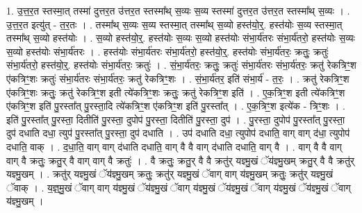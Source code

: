 \documentclass[17pt]{extarticle}
\begin{document}
1. उ॒त्त॒र॒त स्तस्मा॒त् तस्मा॑ दुत्तर॒त उ॑त्तर॒त स्तस्मा᳚थ् स॒व्यः स॒व्य स्तस्मा॑ दुत्तर॒त उ॑त्तर॒त स्तस्मा᳚थ् स॒व्यः । . उ॒त्त॒र॒त इत्यु॑त् - त॒र॒तः । . तस्मा᳚थ् स॒व्यः स॒व्य स्तस्मा॒त् तस्मा᳚थ् स॒व्यो हस्त॑यो॒र्॒. हस्त॑योः स॒व्य स्तस्मा॒त् तस्मा᳚थ् स॒व्यो हस्त॑योः । . स॒व्यो हस्त॑यो॒र्॒. हस्त॑योः स॒व्यः स॒व्यो हस्त॑योः संभा॒र्य॑तरः संभा॒र्य॑तरो॒ हस्त॑योः स॒व्यः स॒व्यो हस्त॑योः संभा॒र्य॑तरः । . हस्त॑योः संभा॒र्य॑तरः संभा॒र्य॑तरो॒ हस्त॑यो॒र्॒. हस्त॑योः संभा॒र्य॑तरः॒ क्रतुः॒ क्रतुः॑ संभा॒र्य॑तरो॒ हस्त॑यो॒र्॒. हस्त॑योः संभा॒र्य॑तरः॒ क्रतुः॑ । . सं॒भा॒र्य॑तरः॒ क्रतुः॒ क्रतुः॑ संभा॒र्य॑तरः संभा॒र्य॑तरः॒ क्रतु॑ रेकत्रिꣳ॒॒श ए॑कत्रिꣳ॒॒शः क्रतुः॑ संभा॒र्य॑तरः संभा॒र्य॑तरः॒ क्रतु॑ रेकत्रिꣳ॒॒शः । . सं॒भा॒र्य॑तर॒ इति॑ संभा॒र्य॑ - त॒रः॒ । . क्रतु॑ रेकत्रिꣳ॒॒श ए॑कत्रिꣳ॒॒शः क्रतुः॒ क्रतु॑ रेकत्रिꣳ॒॒श इती त्ये॑कत्रिꣳ॒॒शः क्रतुः॒ क्रतु॑ रेकत्रिꣳ॒॒श इति॑ । . ए॒क॒त्रिꣳ॒॒श इती त्ये॑कत्रिꣳ॒॒श ए॑कत्रिꣳ॒॒श इति॑ पु॒रस्ता᳚त् पु॒रस्ता॒दि त्ये॑कत्रिꣳ॒॒श ए॑कत्रिꣳ॒॒श इति॑ पु॒रस्ता᳚त् । . ए॒क॒त्रिꣳ॒॒श इत्ये॑क - त्रिꣳ॒॒शः । . इति॑ पु॒रस्ता᳚त् पु॒रस्ता॒ दितीति॑ पु॒रस्ता॒ दुपोप॑ पु॒रस्ता॒ दितीति॑ पु॒रस्ता॒ दुप॑ । . पु॒रस्ता॒ दुपोप॑ पु॒रस्ता᳚त् पु॒रस्ता॒ दुप॑ दधाति दधा॒ त्युप॑ पु॒रस्ता᳚त् पु॒रस्ता॒ दुप॑ दधाति । . उप॑ दधाति दधा॒ त्युपोप॑ दधाति॒ वाग् वाग् द॑धा॒ त्युपोप॑ दधाति॒ वाक् । . द॒धा॒ति॒ वाग् वाग् द॑धाति दधाति॒ वाग् वै वै वाग् द॑धाति दधाति॒ वाग् वै । . वाग् वै वै वाग् वाग् वै क्रतुः॒ क्रतु॒र् वै वाग् वाग् वै क्रतुः॑ । . वै क्रतुः॒ क्रतु॒र् वै वै क्रतु॑र् यज्ञ्मु॒खं ॅय॑ज्ञ्मु॒खम् क्रतु॒र् वै वै क्रतु॑र् यज्ञ्मु॒खम् । . क्रतु॑र् यज्ञ्मु॒खं ॅय॑ज्ञ्मु॒खम् क्रतुः॒ क्रतु॑र् यज्ञ्मु॒खं ॅवाग् वाग् य॑ज्ञ्मु॒खम् क्रतुः॒ क्रतु॑र् यज्ञ्मु॒खं ॅवाक् । . य॒ज्ञ्॒मु॒खं ॅवाग् वाग् य॑ज्ञ्मु॒खं ॅय॑ज्ञ्मु॒खं ॅवाग् य॑ज्ञ्मु॒खं ॅय॑ज्ञ्मु॒खं ॅवाग् य॑ज्ञ्मु॒खं ॅय॑ज्ञ्मु॒खं ॅवाग् य॑ज्ञ्मु॒खम् । \newline
\end{document}
